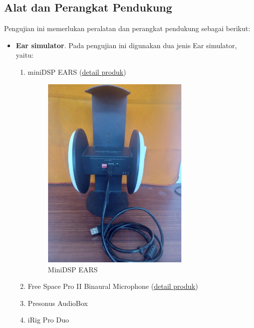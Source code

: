 \documentclass{article}
\begin{document}
	\subsection{Alat dan Perangkat Pendukung}
	Pengujian ini memerlukan peralatan dan perangkat pendukung sebagai berikut:
	\begin{itemize}
		\item \textbf{Ear simulator}. Pada pengujian ini digunakan dua jenis Ear simulator, yaitu:
		\begin{enumerate}
			\item miniDSP EARS (\href{https://www.minidsp.com/images/documents/Product%20Brief-EARS.pdf}{detail produk})
			\begin{figure}[H]
				\centering
				\includegraphics[width=200pt,angle=-90]{images/unit/ears}
				\caption{MiniDSP EARS}
			\end{figure}
			
			\item Free Space Pro II Binaural Microphone (\href{https://3diosound.com/products/free-space-pro-binaural-microphone}{detail produk})
			
			\item Presonus AudioBox
			
			\item iRig Pro Duo
			
		\end{enumerate}
	

\end{itemize}
\end{document}
